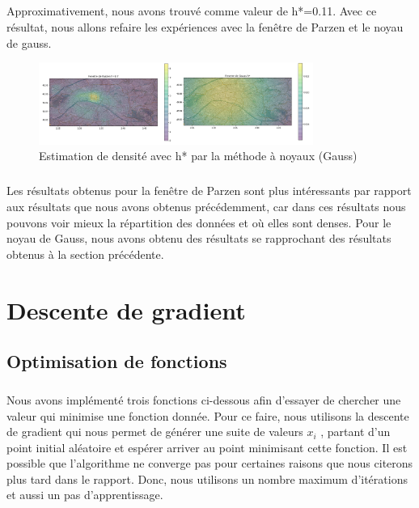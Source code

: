 \documentclass{report}
\begin{document}
\paragraph{}
Approximativement, nous avons trouvé comme valeur de h*=0.11. Avec ce résultat, nous allons refaire les expériences avec la fenêtre de Parzen et le noyau de gauss.
\begin{figure}[H]
	\begin{center}
		\includegraphics[width=0.8\textwidth]{h*_test.png}
		\caption{Estimation de densité avec h* par la méthode à noyaux (Gauss)}
	\end{center}
\end{figure}
\paragraph{}
Les résultats obtenus pour la fenêtre de Parzen sont plus intéressants par rapport aux résultats que nous avons obtenus précédemment, car dans ces résultats nous pouvons voir mieux la répartition des données et où elles sont denses. Pour le noyau de Gauss, nous avons obtenu des résultats se rapprochant des résultats obtenus à la section précédente. 
\chapter{Descente de gradient}
\section{Optimisation de fonctions}
\paragraph{}
Nous avons implémenté trois fonctions ci-dessous afin d'essayer de chercher une valeur qui minimise une fonction donnée. Pour ce faire, nous utilisons la descente de gradient qui nous permet de générer une suite de valeurs $ x_{i} $ , partant d'un point initial aléatoire et espérer arriver au point minimisant cette fonction. Il est possible que l'algorithme ne converge pas pour certaines raisons que nous citerons plus tard dans le rapport. Donc, nous utilisons un nombre maximum d'itérations et aussi un pas d'apprentissage.
\end{document}
